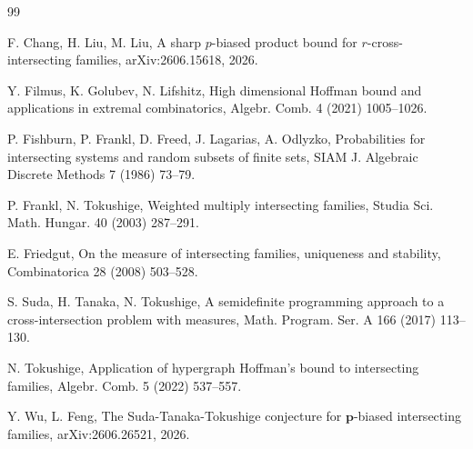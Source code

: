 \documentclass[11pt]{article}
\begin{document}
\begin{thebibliography}{99}







F. Chang, H. Liu,  M. Liu, A sharp $p$-biased product bound for $r$-cross-intersecting families,  arXiv:2606.15618, 2026.





Y. Filmus, K. Golubev,  N. Lifshitz, High dimensional Hoffman bound and applications in extremal combinatorics, Algebr. Comb. 4 (2021) 1005--1026.

 P. Fishburn, P. Frankl, D. Freed, J. Lagarias, A.  Odlyzko, Probabilities for intersecting systems and random subsets of finite sets, SIAM J. Algebraic Discrete Methods 7 (1986) 73--79.

P. Frankl,  N. Tokushige, Weighted multiply intersecting families, Studia Sci. Math. Hungar. 40 (2003) 287--291.


 E. Friedgut, On the measure of intersecting families, uniqueness and stability, Combinatorica 28 (2008) 503--528.


 S. Suda, H. Tanaka,  N. Tokushige, A semidefinite programming approach to a cross-intersection problem with measures, Math. Program. Ser. A 166 (2017) 113--130.



 N. Tokushige, Application of hypergraph Hoffman's bound to intersecting families, Algebr.  Comb.  5 (2022) 537--557.



Y. Wu, L. Feng, The Suda-Tanaka-Tokushige conjecture for $\mathbf{p}$-biased  intersecting families,  arXiv:2606.26521, 2026.








\end{thebibliography}
\end{document}
